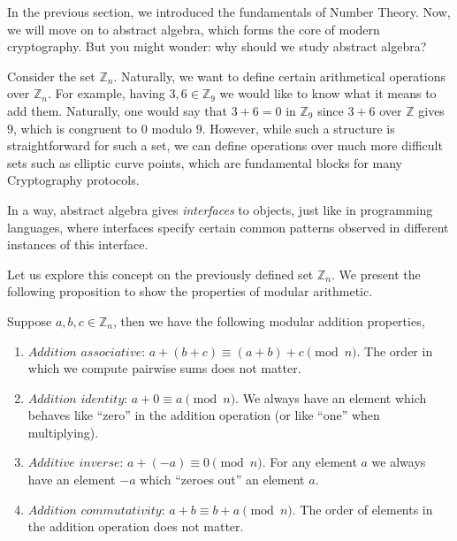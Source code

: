 \documentclass[../../book.tex]{subfiles}
\begin{document}
In the previous section, we introduced the fundamentals of Number Theory. 
Now, we will move on to abstract algebra, which forms the core of modern 
cryptography. But you might wonder: why should we study abstract algebra?

Consider the set $\mathbb{Z}_n$. Naturally, we want to define certain
arithmetical operations over $\mathbb{Z}_n$. For example, having $3, 6 \in
\mathbb{Z}_9$ we would like to know what it means to add them. Naturally, one
would say that $3+6=0$ in $\mathbb{Z}_9$ since $3+6$ over $\mathbb{Z}$ gives $9$,
which is congruent to $0$ modulo $9$. However, while such a structure is
straightforward for such a set, we can define operations over much more
difficult sets such as elliptic curve points, which are fundamental blocks for
many Cryptography protocols.  

In a way, abstract algebra gives \textit{interfaces} to objects, just like in programming 
languages, where interfaces specify certain common patterns observed in different 
instances of this interface. 

Let us explore this concept on the previously defined set $\mathbb{Z}_n$. We present 
the following proposition to show the properties of modular arithmetic.

\vspace{-1.2mm}

\begin{proposition}
    Suppose $a, b, c \in \mathbb{Z}_n$, then we have the following modular addition properties,

    \begin{enumerate}
        \item $\textit{Addition associative: } a + (b + c) \equiv (a + b) + c \pmod{n}$. The order in 
        which we compute pairwise sums does not matter.
        \item $\textit{Addition identity: } a + 0 \equiv a \pmod{n}$. We always have an element which 
        behaves like ``zero'' in the addition operation (or like ``one'' when multiplying).
        \item $\textit{Additive inverse: } a + (-a) \equiv 0 \pmod{n}$. For any
        element $a$ we always have an element $-a$ which ``zeroes out'' an element $a$.
        \item $\textit{Addition commutativity: } a + b \equiv b + a \pmod{n}$. The order of elements in
        the addition operation does not matter.
    \end{enumerate}
\end{proposition}
\end{document}
